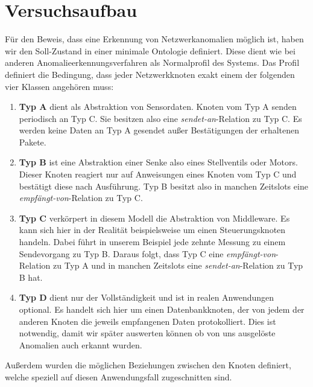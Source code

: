 \chapter{Versuchsaufbau}
Für den Beweis, dass eine Erkennung von Netzwerkanomalien möglich ist, haben wir den Soll-Zustand in einer minimale Ontologie definiert. Diese dient wie bei anderen Anomalieerkennungsverfahren als Normalprofil des Systems\cite{ye2001anomaly}. Das Profil definiert die Bedingung, dass jeder Netzwerkknoten exakt einem der folgenden vier Klassen angehören muss: \label{chap:4:model}
\begin{enumerate}
\item\textbf{Typ A} dient als Abstraktion von Sensordaten. Knoten vom Typ A senden periodisch an Typ C. Sie besitzen also eine \textit{sendet-an}-Relation zu Typ C. Es werden keine Daten an Typ A gesendet außer Bestätigungen der erhaltenen Pakete.
\item\textbf{Typ B} ist eine Abstraktion einer Senke also eines Stellventils oder Motors. Dieser Knoten reagiert nur auf Anweisungen eines Knoten vom Typ C und bestätigt diese nach Ausführung. Typ B besitzt also in manchen Zeitslots eine \textit{empfängt-von}-Relation zu Typ C.
\item\textbf{Typ C} verkörpert in diesem Modell die Abstraktion von Middleware. Es kann sich hier in der Realität beispielsweise um einen Steuerungsknoten handeln. Dabei führt in unserem Beispiel jede zehnte Messung zu einem Sendevorgang zu Typ B. Daraus folgt, dass Typ C eine \textit{empfängt-von}-Relation zu Typ A und in manchen Zeitslots eine \textit{sendet-an}-Relation zu Typ B hat.
\item\textbf{Typ D} dient nur der Vollständigkeit und ist in realen Anwendungen optional. Es handelt sich hier um einen Datenbankknoten, der von jedem der anderen Knoten die jeweils empfangenen Daten protokolliert. Dies ist notwendig, damit wir später auswerten können ob von uns ausgelöste Anomalien auch erkannt wurden.
\end{enumerate}
Außerdem wurden die möglichen Beziehungen zwischen den Knoten definiert, welche speziell auf diesen Anwendungsfall zugeschnitten sind.

